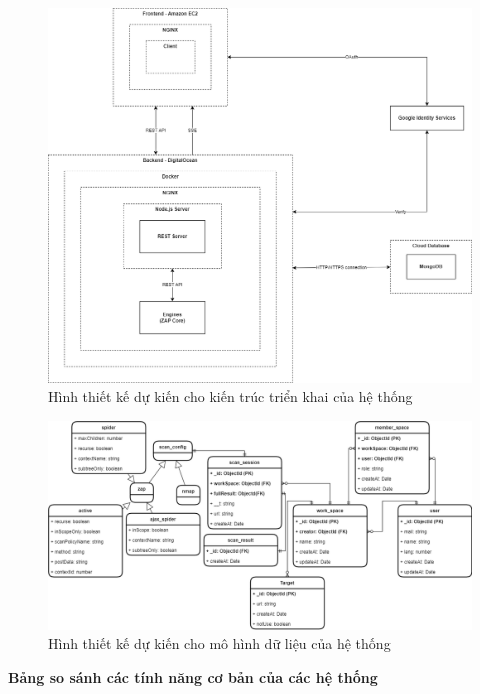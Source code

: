 
\begin{figure}[H]
    \centering
    \includegraphics[width=\textwidth]{images/diagram/diagram_04112023/ZAPOP Architecture.png}
    \caption{Hình thiết kế dự kiến cho kiến trúc triển khai của hệ thống}
\end{figure}


\begin{figure}[H]
    \centering
    \includegraphics[width=\textwidth]{images/diagram/diagram_25102022/Database Diagram.png}
    \caption{Hình thiết kế dự kiến cho mô hình dữ liệu của hệ thống}
\end{figure}

\textbf{Bảng so sánh các tính năng cơ bản của các hệ thống}

